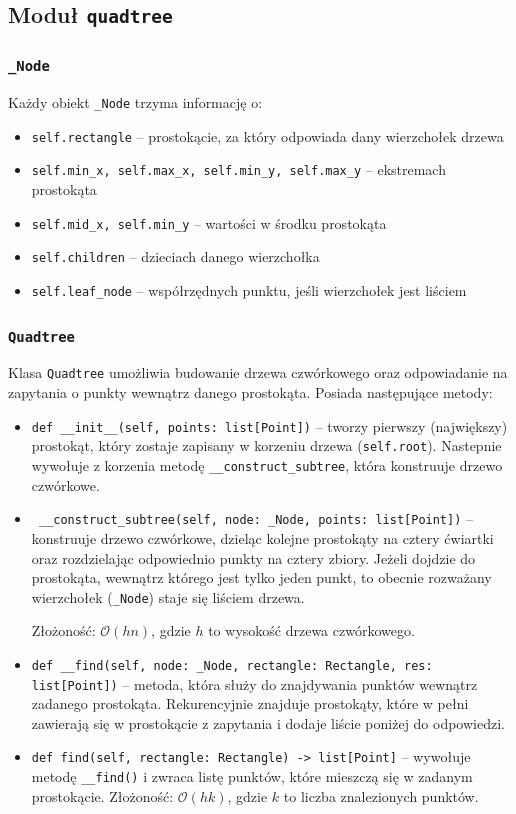 \documentclass[11pt]{scrartcl}
\newcommand{\sO}{\mathcal O}
\begin{document}
\subsection{Moduł \texttt{quadtree}}
\subsubsection{\texttt{\_Node}}
Każdy obiekt \texttt{\_Node} trzyma informację o:
\begin{itemize}
    \item \texttt{self.rectangle} -- prostokącie, za który odpowiada dany wierzchołek drzewa
    \item \texttt{self.min\_x, self.max\_x, self.min\_y, self.max\_y} -- ekstremach prostokąta
    \item \texttt{self.mid\_x, self.min\_y} -- wartości w środku prostokąta
    \item \texttt{self.children} -- dzieciach danego wierzchołka
    \item \texttt{self.leaf\_node} -- współrzędnych punktu, jeśli wierzchołek jest liściem
\end{itemize}

\subsubsection{\texttt{Quadtree}}
Klasa \texttt{Quadtree} umożliwia budowanie drzewa czwórkowego oraz odpowiadanie na zapytania o punkty wewnątrz danego prostokąta. Posiada następujące metody:
\begin{itemize}
    \item \texttt{def \_\_init\_\_(self, points: list[Point])} -- tworzy pierwszy (największy) prostokąt, który zostaje zapisany w korzeniu drzewa (\texttt{self.root}). Nastepnie wywołuje z korzenia metodę \texttt{\_\_construct\_subtree}, która konstruuje drzewo czwórkowe.
    \item \texttt{ \_\_construct\_subtree(self, node: \_Node, points: list[Point])} -- konstruuje drzewo czwórkowe, dzieląc kolejne prostokąty na cztery ćwiartki oraz rozdzielając odpowiednio punkty na cztery zbiory. Jeżeli dojdzie do prostokąta, wewnątrz którego jest tylko jeden punkt, to obecnie rozważany wierzchołek (\texttt{\_Node}) staje się liściem drzewa.

    Złożoność: $\sO(hn)$, gdzie $h$ to wysokość drzewa czwórkowego.
    \item  \texttt{def \_\_find(self, node: \_Node, rectangle: Rectangle, res: list[Point])} -- metoda, która służy do znajdywania punktów wewnątrz zadanego prostokąta. Rekurencyjnie znajduje prostokąty, które w pełni zawierają się w prostokącie z zapytania i dodaje liście poniżej do odpowiedzi.
    \item \texttt{def find(self, rectangle: Rectangle) -> list[Point]} -- wywołuje metodę \texttt{\_\_find()} i zwraca listę punktów, które mieszczą się w zadanym prostokącie. Złożoność: $\sO(hk)$, gdzie $k$ to liczba znalezionych punktów.
\end{itemize}
\end{document}
